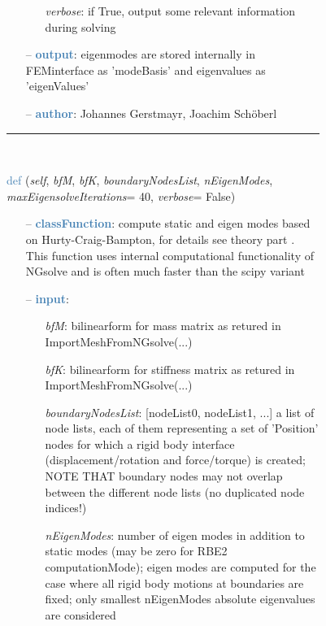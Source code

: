 \begin{itemize}[leftmargin=1.4cm]
\begin{itemize}[leftmargin=0.5cm]
\begin{itemize}[leftmargin=1.4cm]
\begin{itemize}[leftmargin=1.4cm]
\begin{itemize}[leftmargin=0.5cm]
\begin{itemize}[leftmargin=0.7cm]
\begin{itemize}[leftmargin=1.2cm]
    \item[] {\it   verbose}: if True, output some relevant information during solving
  \end{itemize}
  \item[--]  \textcolor{steelblue}{\bf output}: eigenmodes are stored internally in FEMinterface as 'modeBasis' and eigenvalues as 'eigenValues'  \item[--]  \textcolor{steelblue}{\bf author}: Johannes Gerstmayr, Joachim Sch\"oberl\vspace{12pt}\end{itemize}
%
\noindent\rule{8cm}{0.75pt}\vspace{1pt} \\ 
\begin{flushleft}
\noindent \textcolor{steelblue}{def {\bf {}}}\label{sec:FEM:FEMinterface:ComputeHurtyCraigBamptonModesNGsolve}
({\it self}, {\it bfM}, {\it bfK}, {\it boundaryNodesList}, {\it nEigenModes}, {\it maxEigensolveIterations}= 40, {\it verbose}= False)
\end{flushleft}
\setlength{\itemindent}{0.7cm}
\begin{itemize}[leftmargin=0.7cm]
  \item[--]  \textcolor{steelblue}{\bf classFunction}: compute static  and eigen modes based on Hurty-Craig-Bampton, for details see theory part . This function uses internal computational functionality of NGsolve and is often much faster than the scipy variant  \item[--]  \textcolor{steelblue}{\bf input}: \vspace{-6pt}
  \begin{itemize}[leftmargin=1.2cm]
\setlength{\itemindent}{-0.7cm}
    \item[] {\it bfM}: bilinearform for mass matrix as retured in ImportMeshFromNGsolve(...)
    \item[] {\it   bfK}: bilinearform for stiffness matrix as retured in ImportMeshFromNGsolve(...)
    \item[] {\it   boundaryNodesList}: [nodeList0, nodeList1, ...] a list of node lists, each of them representing a set of 'Position' nodes for which a rigid body interface (displacement/rotation and force/torque) is created; NOTE THAT boundary nodes may not overlap between the different node lists (no duplicated node indices!)
    \item[] {\it   nEigenModes}: number of eigen modes in addition to static modes (may be zero for RBE2 computationMode); eigen modes are computed for the case where all rigid body motions at boundaries are fixed; only smallest nEigenModes absolute eigenvalues are considered

\end{itemize}
\end{itemize}
\end{itemize}
\end{itemize}
\end{itemize}
\end{itemize}
\end{itemize}
